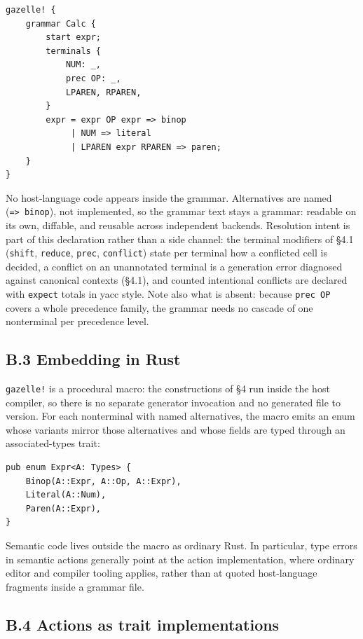 \documentclass[
  10pt,
]{article}
\begin{document}
\begin{verbatim}
gazelle! {
    grammar Calc {
        start expr;
        terminals {
            NUM: _,
            prec OP: _,
            LPAREN, RPAREN,
        }
        expr = expr OP expr => binop
             | NUM => literal
             | LPAREN expr RPAREN => paren;
    }
}
\end{verbatim}

No host-language code appears inside the grammar. Alternatives are named
(\texttt{=\textgreater{}\ binop}), not implemented, so the grammar text
stays a grammar: readable on its own, diffable, and reusable across
independent backends. Resolution intent is part of this declaration
rather than a side channel: the terminal modifiers of §4.1
(\texttt{shift}, \texttt{reduce}, \texttt{prec}, \texttt{conflict})
state per terminal how a conflicted cell is decided, a conflict on an
unannotated terminal is a generation error diagnosed against canonical
contexts (§4.1), and counted intentional conflicts are declared with
\texttt{expect} totals in yacc style. Note also what is absent: because
\texttt{prec\ OP} covers a whole precedence family, the grammar needs no
cascade of one nonterminal per precedence level.

\hypertarget{b3-embedding-in-rust}{%
\subsection{B.3 Embedding in Rust}\label{b3-embedding-in-rust}}

\texttt{gazelle!} is a procedural macro: the constructions of §4 run
inside the host compiler, so there is no separate generator invocation
and no generated file to version. For each nonterminal with named
alternatives, the macro emits an enum whose variants mirror those
alternatives and whose fields are typed through an associated-types
trait:

\begin{verbatim}
pub enum Expr<A: Types> {
    Binop(A::Expr, A::Op, A::Expr),
    Literal(A::Num),
    Paren(A::Expr),
}
\end{verbatim}

Semantic code lives outside the macro as ordinary Rust. In particular,
type errors in semantic actions generally point at the action
implementation, where ordinary editor and compiler tooling applies,
rather than at quoted host-language fragments inside a grammar file.

\hypertarget{b4-actions-as-trait-implementations}{%
\subsection{B.4 Actions as trait
implementations}\label{b4-actions-as-trait-implementations}}
\end{document}
